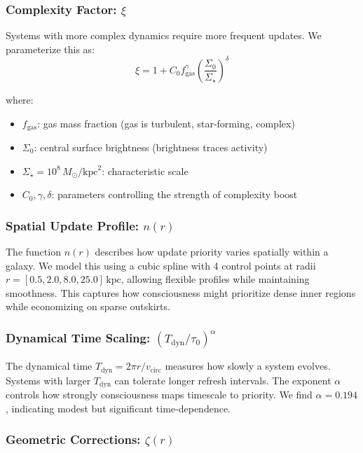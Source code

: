 \documentclass[twocolumn,prd,amsmath,amssymb,aps,superscriptaddress,nofootinbib]{revtex4-2}
\newcommand{\Msun}{M_{\odot}}
\newcommand{\kpc}{\text{kpc}}
\begin{document}
\subsubsection{Complexity Factor: $\xi$}

Systems with more complex dynamics require more frequent updates. We parameterize this as:
\begin{equation}
\xi = 1 + C_0 f_{\text{gas}}^\gamma \left(\frac{\Sigma_0}{\Sigma_\star}\right)^\delta
\label{eq:complexity}
\end{equation}

where:
\begin{itemize}
\item $f_{\text{gas}}$: gas mass fraction (gas is turbulent, star-forming, complex)
\item $\Sigma_0$: central surface brightness (brightness traces activity)
\item $\Sigma_\star = 10^8\,\Msun/\kpc^2$: characteristic scale
\item $C_0, \gamma, \delta$: parameters controlling the strength of complexity boost
\end{itemize}

\subsubsection{Spatial Update Profile: $n(r)$}

The function $n(r)$ describes how update priority varies spatially within a galaxy. We model this using a cubic spline with 4 control points at radii $r = [0.5, 2.0, 8.0, 25.0]\,\kpc$, allowing flexible profiles while maintaining smoothness. This captures how consciousness might prioritize dense inner regions while economizing on sparse outskirts.

\subsubsection{Dynamical Time Scaling: $(T_{\text{dyn}}/\tau_0)^\alpha$}

The dynamical time $T_{\text{dyn}} = 2\pi r/v_{\text{circ}}$ measures how slowly a system evolves. Systems with larger $T_{\text{dyn}}$ can tolerate longer refresh intervals. The exponent $\alpha$ controls how strongly consciousness maps timescale to priority. We find $\alpha = 0.194$, indicating modest but significant time-dependence.

\subsubsection{Geometric Corrections: $\zeta(r)$}
\end{document}
